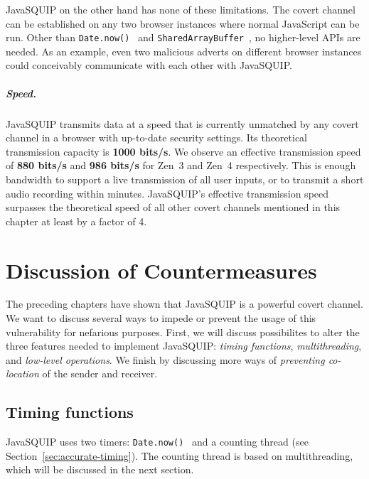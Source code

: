\documentclass[11pt,
  titlepage=false,
  parskip=half,      %
]{scrreprt}
\begin{document}
JavaSQUIP on the other hand has none of these limitations.
The covert channel can be established on any two browser instances where normal JavaScript can be run.
Other than \texttt{Date.now()}~\cite{datenow} and \texttt{SharedArrayBuffer}~\cite{sharedarraybuffer},
no higher-level APIs are needed.
As an example, even two malicious adverts on different browser instances could conceivably communicate with each other
with JavaSQUIP.

\paragraph{Speed.}
JavaSQUIP transmits data at a speed that is currently unmatched by any covert channel in a browser with up-to-date security settings.
Its theoretical transmission capacity is \textbf{1000 bits/s}.
We observe an effective transmission speed of \textbf{880 bits/s} and \textbf{986 bits/s} for Zen~3 and Zen~4 respectively.
This is enough bandwidth to support a live transmission of all user inputs, or to transmit a short audio recording within minutes.
JavaSQUIP's effective transmission speed surpasses the theoretical speed of all other covert channels mentioned in this chapter at least by a factor of 4.

\chapter{Discussion of Countermeasures}
\label{ch:countermeasures}

The preceding chapters have shown that JavaSQUIP is a powerful covert channel.
We want to discuss several ways to impede or prevent the usage of this vulnerability for nefarious purposes.
First, we will discuss possibilites to alter the three features needed to implement JavaSQUIP:
\textit{timing functions}, \textit{multithreading}, and \textit{low-level operations}.
We finish by discussing more ways of \textit{preventing co-location} of the sender and receiver.

\section{Timing functions}
JavaSQUIP uses two timers: \texttt{Date.now()}~\cite{datenow} and a counting thread (see Section~\ref{sec:accurate-timing}).
The counting thread is based on multithreading, which will be discussed in the next section.
\end{document}
